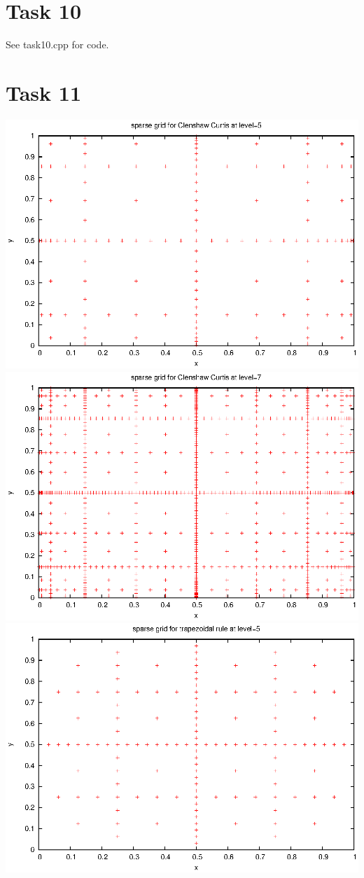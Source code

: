\documentclass[]{article}
\begin{document}
\section*{Task 10}
See task10.cpp for code.

\section*{Task 11}
\includegraphics{task11_cc5}\\
\includegraphics{task11_cc7}\\
\includegraphics{task11_trap_5}\\
\end{document}
